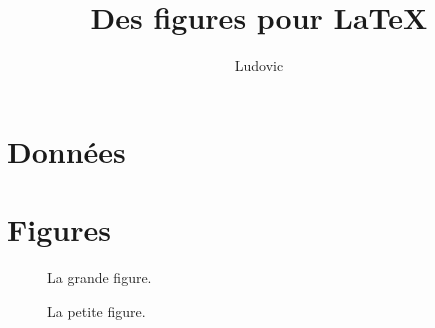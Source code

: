 \documentclass[10pt,a4paper,twoside,twocolumn]{article}
\author{Ludovic}
\title{Des figures pour \LaTeX}
\begin{document}
\maketitle

\section{Données}

\section{Figures}
\blindtext[10]

\begin{figure} %
  \begin{center}
    \caption{La grande figure.}
  \end{center}
\end{figure}

\begin{figure} %
  \begin{center}
    \caption{La petite figure.}
  \end{center}
\end{figure}

\blindtext[10]
\end{document}
